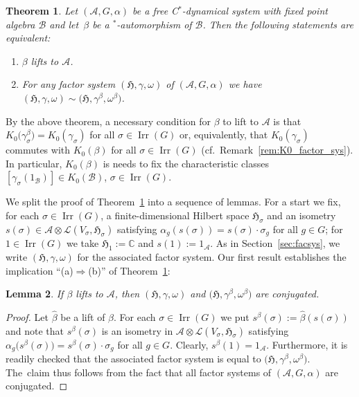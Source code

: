 \documentclass[pdftex]{sigma}
\numberwithin{equation}{section}
\newtheorem{Theorem}{Theorem}[section]
\newtheorem{Lemma}[Theorem]{Lemma}
\newcommand*{\C}{\mathbb C}		%
\newcommand*{\tensor}{\otimes}		%
\newcommand*{\Star}{$^*$\nobreakdash}
\newcommand*{\hilb}{\mathfrak}		%
\newcommand*{\alg}{\mathcal}		%
\newcommand*{\hH}{\hilb{H}}			%
\newcommand*{\one}{1}				%
\newcommand*{\aA}{\alg{A}}			%
\newcommand*{\aB}{\alg{B}} 			%
\newcommand*{\End}{\mathcal{L}} %
\DeclareMathOperator{\Irrep}{Irr} 			%
\begin{document}
\begin{Theorem}\label{thm:lift_conjugated_factor_sys}
	Let $(\aA, G, \alpha)$ be a free C\Star-dynamical system with fixed point algebra $\aB$ and let~$\beta$ be a \Star-automorphism of $\aB$.
	Then the following statements are equivalent:
	\begin{enumerate}\itemsep=0pt
	\item[$(a)$] $\beta$ lifts to $\aA$.
	\item[$(b)$] For any factor system $(\hH, \gamma, \omega)$ of $(\aA, G, \alpha)$ we have $(\hH, \gamma, \omega) \sim \big(\hH, \gamma^\beta, \omega^\beta\big)$.
	\end{enumerate}
\end{Theorem}
\begin{Remark}
	By the above theorem, a necessary condition for $\beta$ to lift to $\aA$ is that $K_0\big(\gamma_\sigma^\beta\big) = K_0(\gamma_\sigma)$ for all $\sigma \in \Irrep(G)$ or, equivalently, that $K_0(\gamma_\sigma)$ commutes with $K_0(\beta)$ for all $\sigma \in \Irrep(G)$ (cf.~Remark~\ref{rem:K0_factor_sys}).
	In particular, $K_0(\beta)$ is needs to fix the characteristic classes $[\gamma_\sigma(\one_\aB)] \in K_0(\aB)$, $\sigma \in \Irrep(G)$.
\end{Remark}

We split the proof of Theorem~\ref{thm:lift_conjugated_factor_sys} into a sequence of lemmas.
For a start we fix, for each $\sigma \in \Irrep(G)$, a finite-dimensional Hilbert space $\hH_\sigma$ and an isometry $s(\sigma)\in \aA \tensor \End(V_\sigma,\hH_\sigma)$ satisfying $\alpha_g (s(\sigma) )=s(\sigma) \cdot \sigma_g$ for all $g \in G$; for $1 \in \Irrep(G)$ we take $\hH_1 := \C$ and $s(1) := \one_\aA$.
As in Section~\ref{sec:facsys}, we write $(\hH, \gamma, \omega)$ for the associated factor system.
Our first result establishes the implication ``(a)$\Rightarrow$(b)'' of Theorem~\ref{thm:lift_conjugated_factor_sys}:

\begin{Lemma}\label{lem:conjugated}
	If $\beta$ lifts to $\aA$, then $(\hH, \gamma, \omega)$ and $\big(\hH, \gamma^\beta, \omega^\beta\big)$ are conjugated.
\end{Lemma}
\begin{proof}
	Let $\hat \beta$ be a lift of $\beta$.
	For each $\sigma \in \Irrep(G)$ we put $s^\beta(\sigma) := \hat \beta ( s(\sigma) )$ and note that $s^\beta(\sigma)$ is an isometry in $\aA \tensor \End(V_\sigma,\hH_\sigma)$ satisfying $\alpha_g\big(s^\beta(\sigma)\big)=s^\beta(\sigma) \cdot \sigma_g$ for all $g \in G$.
	Clearly, $s^\beta(1) = \one_\aA$.
	Furthermore, it is readily checked that the associated factor system is equal to $\big(\hH, \gamma^\beta, \omega^\beta\big)$.
	The~claim thus follows from the fact that all factor systems of $(\aA, G, \alpha)$ are conjugated.
\end{proof}
\end{document}
